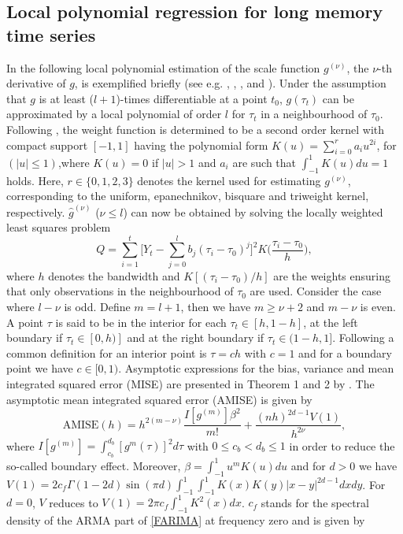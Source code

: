 \documentclass[12pt]{article}
\begin{document}
\subsection{Local polynomial regression for long memory time series}
In the following local polynomial estimation of the scale function $g^{(\nu)}$, the $\nu$-th derivative of $g$, is exemplified briefly (see e.g. \cite{beran2002iterative}, \cite{beran2002local}, \cite{beran2002semifar}, and \cite{beran2013limit}). Under the assumption that $g$ is at least ($l+1$)-times differentiable at a point $t_0$, $g(\tau_t)$ can be approximated by a local polynomial of order $l$ for $\tau_t$ in a neighbourhood of $\tau_0$. Following \citet{gasser1979kernel}, the weight function is determined to be a second order kernel with compact support $[-1,1]$ having the polynomial form $K(u)=\sum_{i=0}^{r}a_i u^{2i}$, for $(|u|\leq1)$,where $K(u)=0$ if $|u|>1$ and $a_i$ are such that $\int_{-1}^{1}K(u)du=1$ holds.  Here, $r \in \{0,1,2,3\}$ denotes the kernel used for estimating $g^{(\nu)}$, corresponding to the uniform, epanechnikov, bisquare and triweight kernel, respectively.
$\hat{g}^{(\nu)}$ ($\nu\leq l$) can now be obtained by solving the locally weighted least squares problem
\begin{equation}
\label{LP}
Q=\sum_{i=1}^{t}\Bigg[Y_t-\sum_{j=0}^{l}b_j(\tau_i-\tau_0)^j\Bigg]^2 K\Big(\frac{\tau_i-\tau_0}{h}\Big),	
\end{equation}
where $h$ denotes the bandwidth and $K[(\tau_i-\tau_0)/h]$ are the weights ensuring that only observations in the neighbourhood of $\tau_0$ are used. Consider the case where $l-\nu$ is odd. Define $m=l+1$, then we have $m \geq \nu + 2$ and $m-\nu$ is even. A point $\tau$ is said to be in the interior for each $\tau_t\in [h,1-h]$, at the left boundary if $\tau_t\in [0,h)]$ and at the right boundary if $\tau_t\in (1-h,1]$. Following \citet{beran2002local} a common definition for an interior point is $\tau=ch$ with $c=1$ and for a boundary point we have $c \in [0,1)$.   
Asymptotic expressions for the bias, variance and mean integrated squared error (MISE) are presented in Theorem 1 and 2 by \citet{beran2002local}. The asymptotic mean integrated squared error (AMISE) is given by
\begin{equation}
	\label{AMISE}
	\text{AMISE}(h) = h^{2(m-\nu)} \frac{I[g^{(m)}]\beta^2}{m!} + \frac{(nh)^{2d-1}V(1)}{h^{2\nu}},
\end{equation}
where $I[g^{(m)}] = \int_{c_b}^{d_b}[g^{m}(\tau)]^2d\tau$ with $0 \leq c_b < d_b \leq 1$ in order to reduce the so-called boundary effect. Moreover, $\beta = \int_{-1}^{1}u^mK(u)du$ and for $d > 0 $ we have $V(1)=2c_f \Gamma(1-2d)\sin (\pi d) \int_{-1}^{1} \int_{-1}^{1} K(x)K(y)|x-y|^{2d-1}dxdy$. For $d = 0$, $V$ reduces to $V(1)=2\pi c_f \int_{-1}^{1}K^2(x)dx$. $c_f$ stands for the spectral density of the ARMA part of \eqref{FARIMA} at frequency zero and is given by 
\end{document}
